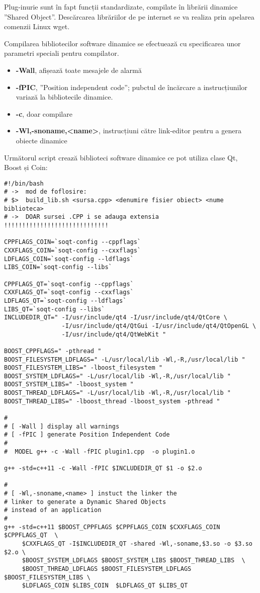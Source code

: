 \par Plug-inurie sunt în fapt funcții standardizate, compilate în librării dinamice ”Shared Object”. Descărcarea librăriilor de pe internet se va realiza prin apelarea comenzii Linux wget. 
\par Compilarea bibliotecilor software dinamice se efectuează cu specificarea unor parametri speciali pentru compilator. \cite{DYN_LIBS}
\begin{itemize}
\item \textbf{-Wall}, afișează toate mesajele de alarmă
\item \textbf{-fPIC}, ”Position independent code”; pubctul de încărcare a instrucțiunilor variază la bibliotecile dinamice. 
\item \textbf{-c}, doar compilare 
\item \textbf{-Wl,-snoname,<name>}, instrucțiuni către link-editor pentru a genera obiecte dinamice
\end{itemize}
Următorul script crează biblioteci software dinamice ce pot utiliza clase Qt, Boost și Coin:
\begin{verbatim}
#!/bin/bash
# ->  mod de foflosire: 
# $>  build_lib.sh <sursa.cpp> <denumire fisier obiect> <nume biblioteca>
# ->  DOAR sursei .CPP i se adauga extensia !!!!!!!!!!!!!!!!!!!!!!!!!!!!! 

CPPFLAGS_COIN=`soqt-config --cppflags`
CXXFLAGS_COIN=`soqt-config --cxxflags`
LDFLAGS_COIN=`soqt-config --ldflags`
LIBS_COIN=`soqt-config --libs`

CPPFLAGS_QT=`soqt-config --cppflags`
CXXFLAGS_QT=`soqt-config --cxxflags`
LDFLAGS_QT=`soqt-config --ldflags`
LIBS_QT=`soqt-config --libs`
INCLUDEDIR_QT=" -I/usr/include/qt4 -I/usr/include/qt4/QtCore \
                -I/usr/include/qt4/QtGui -I/usr/include/qt4/QtOpenGL \
                -I/usr/include/qt4/QtWebKit "

BOOST_CPPFLAGS=" -pthread " 
BOOST_FILESYSTEM_LDFLAGS=" -L/usr/local/lib -Wl,-R,/usr/local/lib "
BOOST_FILESYSTEM_LIBS=" -lboost_filesystem "
BOOST_SYSTEM_LDFLAGS=" -L/usr/local/lib -Wl,-R,/usr/local/lib "
BOOST_SYSTEM_LIBS=" -lboost_system "
BOOST_THREAD_LDFLAGS=" -L/usr/local/lib -Wl,-R,/usr/local/lib "
BOOST_THREAD_LIBS=" -lboost_thread -lboost_system -pthread "

#
# [ -Wall ] display all warnings
# [ -fPIC ] generate Position Independent Code
#
#  MODEL g++ -c -Wall -fPIC plugin1.cpp  -o plugin1.o

g++ -std=c++11 -c -Wall -fPIC $INCLUDEDIR_QT $1 -o $2.o 

#
# [ -Wl,-snoname,<name> ] instuct the linker the
# linker to generate a Dynamic Shared Objects
# instead of an application
#
g++ -std=c++11 $BOOST_CPPFLAGS $CPPFLAGS_COIN $CXXFLAGS_COIN $CPPFLAGS_QT  \
     $CXXFLAGS_QT -I$INCLUDEDIR_QT -shared -Wl,-soname,$3.so -o $3.so $2.o \
     $BOOST_SYSTEM_LDFLAGS $BOOST_SYSTEM_LIBS $BOOST_THREAD_LIBS  \
     $BOOST_THREAD_LDFLAGS $BOOST_FILESYSTEM_LDFLAGS $BOOST_FILESYSTEM_LIBS \
     $LDFLAGS_COIN $LIBS_COIN  $LDFLAGS_QT $LIBS_QT
	
\end{verbatim}
